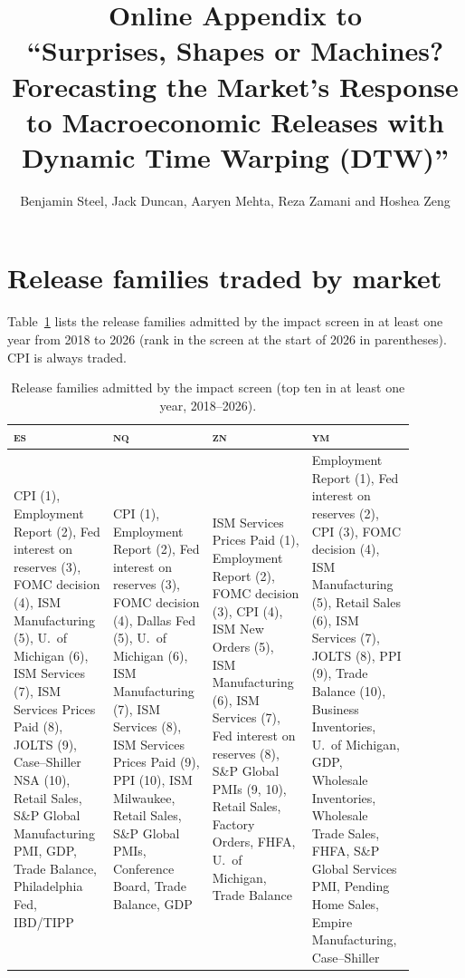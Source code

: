 \documentclass[12pt]{article}
\title{Online Appendix to\\ ``Surprises, Shapes or Machines? Forecasting the Market's Response to Macroeconomic Releases with Dynamic Time Warping (DTW)''}
\author{Benjamin Steel, Jack Duncan, Aaryen Mehta, Reza Zamani and Hoshea Zeng}
\date{}
\newcommand{\ES}{\textsc{es}}\newcommand{\NQ}{\textsc{nq}}\newcommand{\ZN}{\textsc{zn}}\newcommand{\YM}{\textsc{ym}}
\begin{document}
\maketitle

\section{Release families traded by market}
Table~\ref{oa:families} lists the release families admitted by the impact screen in at least one
year from 2018 to 2026 (rank in the screen at the start of 2026 in parentheses). CPI is always
traded.

\begin{table}[htbp]
  \centering\small
  \caption{Release families admitted by the impact screen (top ten in at least one year, 2018--2026).}
  \label{oa:families}
  \footnotesize\begin{tabular}{p{0.22\linewidth}p{0.22\linewidth}p{0.22\linewidth}p{0.22\linewidth}}
    \toprule
    \ES & \NQ & \ZN & \YM \\
    \midrule
    CPI (1), Employment Report (2), Fed interest on reserves (3), FOMC decision (4), ISM
    Manufacturing (5), U.\ of Michigan (6), ISM Services (7), ISM Services Prices Paid (8), JOLTS (9),
    Case--Shiller NSA (10), Retail Sales, S\&P Global Manufacturing PMI, GDP, Trade Balance,
    Philadelphia Fed, IBD/TIPP
    &
    CPI (1), Employment Report (2), Fed interest on reserves (3), FOMC decision (4), Dallas Fed (5),
    U.\ of Michigan (6), ISM Manufacturing (7), ISM Services (8), ISM Services Prices Paid (9), PPI
    (10), ISM Milwaukee, Retail Sales, S\&P Global PMIs, Conference Board, Trade Balance, GDP
    &
    ISM Services Prices Paid (1), Employment Report (2), FOMC decision (3), CPI (4), ISM New Orders
    (5), ISM Manufacturing (6), ISM Services (7), Fed interest on reserves (8), S\&P Global PMIs (9,
    10), Retail Sales, Factory Orders, FHFA, U.\ of Michigan, Trade Balance
    &
    Employment Report (1), Fed interest on reserves (2), CPI (3), FOMC decision (4), ISM
    Manufacturing (5), Retail Sales (6), ISM Services (7), JOLTS (8), PPI (9), Trade Balance (10),
    Business Inventories, U.\ of Michigan, GDP, Wholesale Inventories, Wholesale Trade Sales, FHFA,
    S\&P Global Services PMI, Pending Home Sales, Empire Manufacturing, Case--Shiller \\
    \bottomrule
  \end{tabular}
\end{table}
\end{document}
